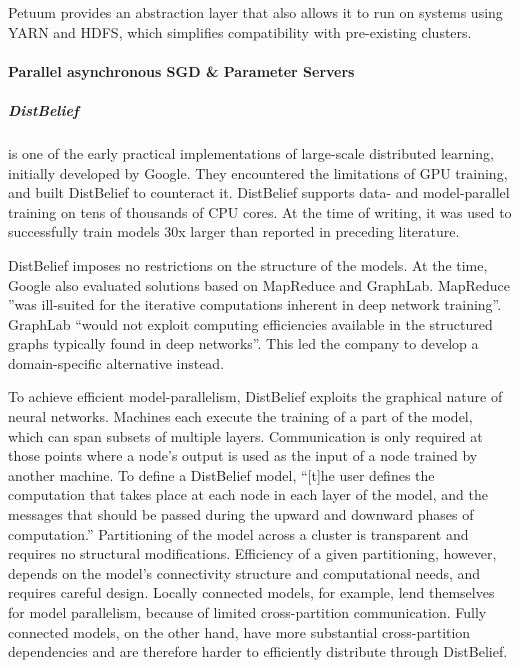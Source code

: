 Petuum provides an abstraction layer that also allows it to run on systems using YARN and HDFS, which simplifies compatibility with pre-existing clusters. 

\paragraph{Parallel asynchronous SGD \& Parameter Servers}

\subparagraph{DistBelief \citep{DistBelief2012}}

is one of the early practical implementations of large-scale distributed learning, initially developed by Google. They encountered the limitations of GPU training, and built DistBelief to counteract it. DistBelief supports data- and model-parallel training on tens of thousands of CPU cores. At the time of writing, it was used to successfully train models 30x larger than reported in preceding literature.

DistBelief imposes no restrictions on the structure of the models. 
At the time, Google also evaluated solutions based on MapReduce\citep{MapReduce} and GraphLab\citep{GraphLab}. MapReduce ”was ill-suited for the iterative computations inherent in deep network training”. GraphLab “would not exploit computing efficiencies available in the structured graphs typically found in deep networks”. This led the company to develop a domain-specific alternative instead.

To achieve efficient model-parallelism, DistBelief exploits the graphical nature of neural networks. Machines each execute the training of a part of the model, which can span subsets of multiple layers. Communication is only required at those points where a node’s output is used as the input of a node trained by another machine. To define a DistBelief model, “[t]he user defines the computation that takes place at each node in each layer of the model, and the messages that should be passed during the upward and downward phases of computation.” Partitioning of the model across a cluster is transparent and requires no structural modifications. Efficiency of a given partitioning, however, depends on the model’s connectivity structure and computational needs, and requires careful design. Locally connected models, for example, lend themselves for model parallelism, because of limited cross-partition communication. Fully connected models, on the other hand, have more substantial cross-partition dependencies and are therefore harder to efficiently distribute through DistBelief.

